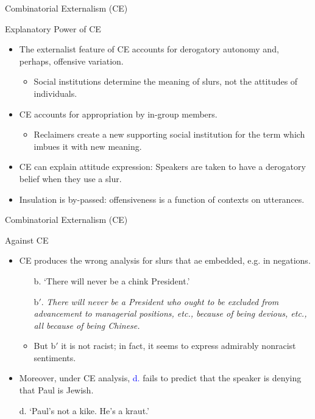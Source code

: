 \documentclass[xcolor=dvipsnames,12pt,handout]{beamer}
\begin{document}
\begin{frame}{Combinatorial Externalism (CE)}

\begin{block}{Explanatory Power of CE}
\pause
\begin{itemize}
\item The externalist feature of CE accounts for derogatory autonomy and, perhaps, offensive variation.
\pause
\medskip
\begin{itemize}
\item Social institutions determine the meaning of slurs, not the attitudes of individuals.
\end{itemize}
\pause
\medskip
\item CE accounts for appropriation by in-group members.
\pause
\begin{itemize}
\item Reclaimers create a new supporting social institution for the term which imbues it with new meaning.
\end{itemize}
\pause
\item CE can explain attitude expression: Speakers are taken to have a derogatory belief when they use a slur.
\pause
\item Insulation is by-passed: offensiveness is a function of contexts on utterances.
\end{itemize}
\end{block}
\end{frame}



\begin{frame}{Combinatorial Externalism (CE)}

\begin{block}{Against CE}
\begin{itemize}
\item CE produces the wrong analysis for slurs that ae embedded, e.g. in negations.
\pause
\begin{itemize}
\item[b.] `There will never be a chink President.'
\pause
\item[b$'$.] \textit{There will never be a President who ought to be excluded from advancement to managerial positions, etc., because of being devious, etc., all because of being Chinese.}
\pause
\item But b$'$ it is not racist; in fact, it seems to express admirably nonracist sentiments.
\end{itemize}
\pause
\item Moreover, under CE analysis, \textcolor{blue}{d.} fails to predict that the speaker is denying that Paul is Jewish.
\item[d.] `Paul's not a kike. He's a kraut.'
\pause
\end{itemize}
\end{block}

\end{frame}
\end{document}
